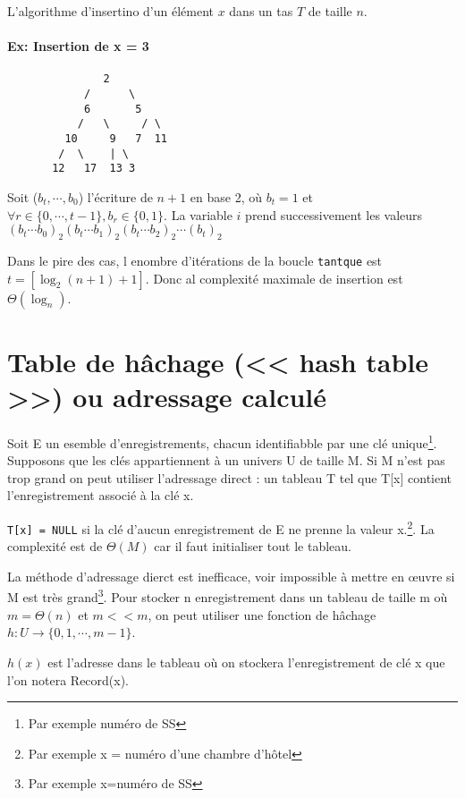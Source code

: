 L'algorithme d'insertino d'un élément $x$ dans un tas $T$ de taille $n$.


\paragraph{Ex: Insertion de x = 3}
\begin{verbatim}
			   2
			/      \
			6       5
		   /   \     / \
		 10     9   7  11             
		/  \    | \
	   12   17	13 3 
   \end{verbatim}

Soit ($b_t, \cdots, b_0$) l'écriture de $n+1$ en base 2, où $b_t=1$ et $\forall r \in \{0,\cdots, t-1\}, b_r \in \{0,1\}.$
La variable $i$ prend successivement les valeurs
$(b_t\cdots b_0)_2 (b_t\cdots b_1)_2 (b_t\cdots b_2)_2 \cdots (b_t)_2$

Dans le pire des cas, l enombre d'itérations de la boucle \texttt{tantque} est $t=[\log_2(n+1)+1]$. Donc al complexité maximale de insertion est $\Theta(\log_n)$. 

\section{Table de hâchage (<< hash table >>) ou adressage calculé}
Soit E un esemble d'enregistrements, chacun identifiabble par une clé unique\footnote{Par exemple numéro de SS}. Supposons que les clés appartiennent à un univers U de taille M. Si M n'est pas trop grand on peut utiliser l'adressage direct : un tableau T tel que T[x] contient l'enregistrement associé à la clé x.

\texttt{T[x] = NULL} si la clé d'aucun enregistrement de E ne prenne la valeur x.\footnote{Par exemple x = numéro d'une chambre d'hôtel}. La complexité est de $\Theta(M)$ car il faut initialiser tout le tableau.

La méthode d'adressage dierct est inefficace, voir impossible à mettre en \oe{}uvre si M est très grand\footnote{Par exemple x=numéro de SS}. Pour stocker n enregistrement dans un tableau de taille m où $m=\Theta(n)$ et $m << m$, on peut utiliser une fonction de hâchage $h : U \rightarrow\{0,1,\cdots,m-1\}$.

$h(x)$ est l'adresse dans le tableau où on stockera l'enregistrement de clé x que l'on notera Record(x).


